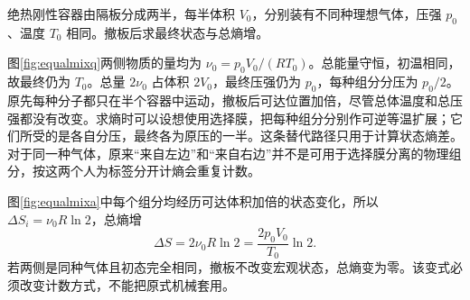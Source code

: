 \begin{example}[同温同压两种气体混合]\label{ex:equalmix}
绝热刚性容器由隔板分成两半，每半体积 $V_0$，分别装有不同种理想气体，压强 $p_0$、温度 $T_0$ 相同。撤板后求最终状态与总熵增。
\end{example}
\begin{solution}
图\ref{fig:equalmixq}两侧物质的量均为 $\nu_0=p_0V_0/(RT_0)$。总能量守恒，初温相同，故最终仍为 $T_0$。总量 $2\nu_0$ 占体积 $2V_0$，最终压强仍为 $p_0$，每种组分分压为 $p_0/2$。
原先每种分子都只在半个容器中运动，撤板后可达位置加倍，尽管总体温度和总压强都没有改变。求熵时可以设想使用选择膜，把每种组分分别作可逆等温扩展；它们所受的是各自分压，最终各为原压的一半。这条替代路径只用于计算状态熵差。对于同一种气体，原来“来自左边”和“来自右边”并不是可用于选择膜分离的物理组分，按这两个人为标签分开计熵会重复计数。

图\ref{fig:equalmixa}中每个组分均经历可达体积加倍的状态变化，所以 $\Delta S_i=\nu_0R\ln2$，总熵增
\[
 \Delta S=2\nu_0R\ln2=\frac{2p_0V_0}{T_0}\ln2.
\]
若两侧是同种气体且初态完全相同，撤板不改变宏观状态，总熵变为零。该变式必须改变计数方式，不能把原式机械套用。
\end{solution}

